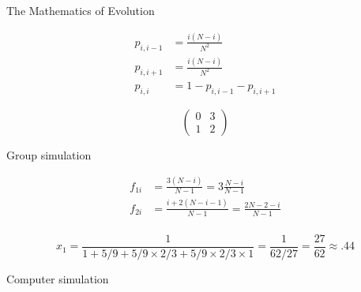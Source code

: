 \documentclass{beamer}
\begin{document}
    \begin{frame}
        \begin{center}
            \Large
            The Mathematics of Evolution
        \end{center}

    \end{frame}

    \begin{frame}
        \begin{center}
            \scalebox{.6}{}
        \end{center}

		\pause

		  \begin{align*}
			  p_{i, i-1}&=\frac{i(N - i)}{N^2}\\
			  p_{i, i+1}&=\frac{i(N - i)}{N^2}\\
			  p_{i, i}&=1 - p_{i, i-1} - p_{i, i+1}
		  \end{align*}

    \end{frame}

\begin{frame}
    \Huge
    \[
        \begin{pmatrix}
            0 & 3\\
            1 & 2
        \end{pmatrix}
    \]
\end{frame}

\begin{frame}
    \Huge
    \begin{center}
        Group simulation
    \end{center}
\end{frame}

\begin{frame}
   \begin{align*}
       f_{1i} &= \frac{3(N-i)}{N - 1}=3\frac{N-i}{N-1}\\
       f_{2i} &= \frac{i+2(N - i -1)}{N - 1}=\frac{2N-2-i}{N - 1}\\
   \end{align*}

   \[
   x_1 = \frac{1}{1 + 5/9 + 5/9\times2/3 +5/9\times2/3\times1}=\frac{1}{62/27}=\frac{27}{62}\approx.44
   \]
\end{frame}

\begin{frame}
    \Huge
    \begin{center}
        Computer simulation
    \end{center}
\end{frame}
\end{document}

